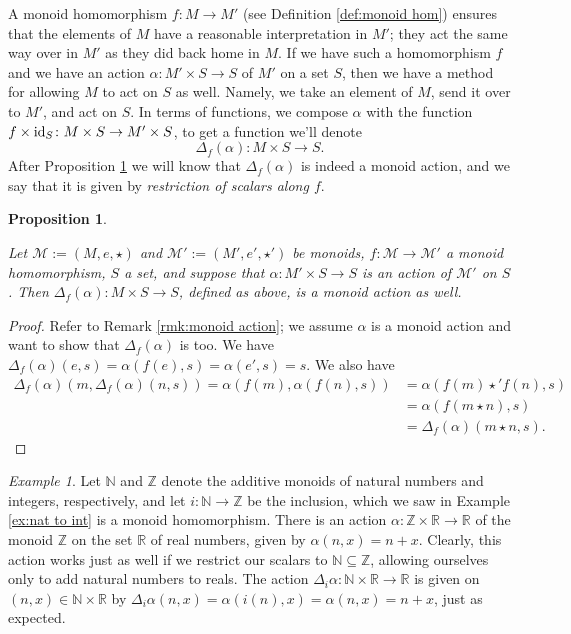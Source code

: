 \documentclass{book}
\def\tn{\textnormal}
\def\mc{\mathcal}
\def\ZZ{{\mathbb Z}}
\def\RR{{\mathbb R}}
\def\NN{{\mathbb N}}
\def\to{\rightarrow}
\def\taking{\colon}
\def\ss{\subseteq}
\def\id{\tn{id}}
\def\mcM{\mc{M}}
\newtheorem{proposition}[subsubsection]{Proposition}
\theoremstyle{remark}
\newtheorem{example}[subsubsection]{Example}
\theoremstyle{definition}
\begin{document}
A monoid homomorphism $f\taking M\to M'$ (see Definition \ref{def:monoid hom}) ensures that the elements of $M$ have a reasonable interpretation in $M'$; they act the same way over in $M'$ as they did back home in $M$. If we have such a homomorphism $f$ and we have an action $\alpha\taking M'\times S\to S$ of $M'$ on a set $S$, then we have a method for allowing $M$ to act on $S$ as well. Namely, we take an element of $M$, send it over to $M'$, and act on $S$. In terms of functions, we compose $\alpha$ with the function $f\times\id_S\taking M\times S\to M'\times S$, to get a function we'll denote $$\Delta_f(\alpha)\taking M\times S\to S.$$ After Proposition \ref{prop:restriction of scalars} we will know that $\Delta_f(\alpha)$ is indeed a monoid action, and we say that it is given by {\em restriction of scalars along $f$}.

\begin{proposition}\label{prop:restriction of scalars}

Let $\mcM:=(M,e,\star)$ and $\mcM':=(M',e',\star')$ be monoids, $f\taking\mcM\to\mcM'$ a monoid homomorphism, $S$ a set, and suppose that $\alpha\taking M'\times S\to S$ is an action of $\mcM'$ on $S$. Then $\Delta_f(\alpha)\taking M\times S\to S$, defined as above, is a monoid action as well.

\end{proposition}

\begin{proof}

Refer to Remark \ref{rmk:monoid action}; we assume $\alpha$ is a monoid action and want to show that $\Delta_f(\alpha)$ is too. We have $\Delta_f(\alpha)(e,s)=\alpha(f(e),s)=\alpha(e',s)=s$. We also have 
\begin{align*}
\Delta_f(\alpha)(m,\Delta_f(\alpha)(n,s))=\alpha(f(m),\alpha(f(n),s))&=\alpha(f(m)\star' f(n),s)\\
&=\alpha(f(m\star n),s)\\
&=\Delta_f(\alpha)(m\star n,s).
\end{align*}

\end{proof}

\begin{example}

Let $\NN$ and $\ZZ$ denote the additive monoids of natural numbers and integers, respectively, and let $i\taking\NN\to\ZZ$ be the inclusion, which we saw in Example \ref{ex:nat to int} is a monoid homomorphism. There is an action $\alpha\taking\ZZ\times\RR\to\RR$ of the monoid $\ZZ$ on the set $\RR$ of real numbers, given by $\alpha(n,x)=n+x$. Clearly, this action works just as well if we restrict our scalars to $\NN\ss\ZZ$, allowing ourselves only to add natural numbers to reals. The action $\Delta_i\alpha\taking\NN\times\RR\to\RR$ is given on $(n,x)\in\NN\times\RR$ by $\Delta_i\alpha(n,x)=\alpha(i(n),x)=\alpha(n,x)=n+x$, just as expected.

\end{example}
\end{document}
